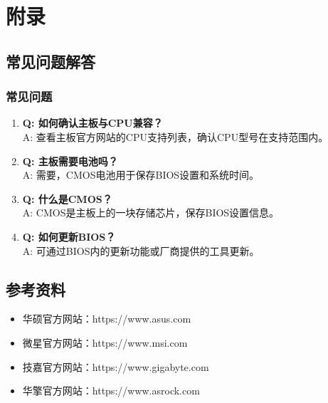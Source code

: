\documentclass[12pt,UTF8]{ctexbook}
\begin{document}
\part{附录}

\chapter{常见问题解答}

\section{常见问题}

\begin{enumerate}
    \item \textbf{Q: 如何确认主板与CPU兼容？}
    \\A: 查看主板官方网站的CPU支持列表，确认CPU型号在支持范围内。
    
    \item \textbf{Q: 主板需要电池吗？}
    \\A: 需要，CMOS电池用于保存BIOS设置和系统时间。
    
    \item \textbf{Q: 什么是CMOS？}
    \\A: CMOS是主板上的一块存储芯片，保存BIOS设置信息。
    
    \item \textbf{Q: 如何更新BIOS？}
    \\A: 可通过BIOS内的更新功能或厂商提供的工具更新。
\end{enumerate}

\chapter{参考资料}

\begin{itemize}[leftmargin=2em]
    \item 华硕官方网站：https://www.asus.com
    \item 微星官方网站：https://www.msi.com
    \item 技嘉官方网站：https://www.gigabyte.com
    \item 华擎官方网站：https://www.asrock.com
\end{itemize}

\backmatter
\end{document}
